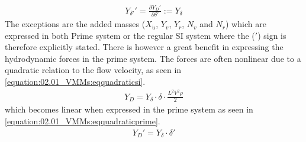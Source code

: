 \begin{equation}\label{equation:02.01_VMMs:eqderivativeprime}
\begin{split}\displaystyle Y_{\delta'}'=\frac{\partial Y_D'}{\partial \delta'} := Y_{\delta} \end{split}
\end{equation}
\sphinxAtStartPar
The exceptions are the added masses (\(X_{\dot{u}}\), \(Y_{\dot{v}}\), \(Y_{\dot{r}}\), \(N_{\dot{v}}\) and \(N_{\dot{r}}\)) which are expressed in both Prime system or the regular SI system where the (\('\)) sign is therefore
explicitly stated.
There is however a great benefit in expressing the hydrodynamic forces in the prime system. The forces are often nonlinear due to a quadratic relation to the flow velocity, as seen in \autoref{equation:02.01_VMMs:eqquadraticsi}.
\begin{equation}\label{equation:02.01_VMMs:eqquadraticsi}
\begin{split}\displaystyle Y_{D}=Y_{\delta} \cdot \delta \cdot \frac{L^2V^2\rho}{2}\end{split}
\end{equation}
which becomes linear when expressed in the prime system as seen in \autoref{equation:02.01_VMMs:eqquadraticprime}.
\begin{equation}\label{equation:02.01_VMMs:eqquadraticprime}
\begin{split}\displaystyle Y_{D}'=Y_{\delta} \cdot \delta'\end{split}
\end{equation}


